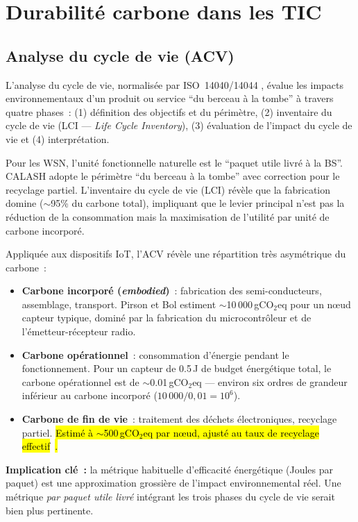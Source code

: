 \section{Durabilité carbone dans les TIC}\label{sec:revlit-carbon}

\subsection{Analyse du cycle de vie (ACV)}

L'analyse du cycle de vie, normalisée par ISO~14040/14044 \cite{iso14040}, évalue les impacts environnementaux d'un produit ou service ``du berceau à la tombe'' à travers quatre phases~: (1) définition des objectifs et du périmètre, (2) inventaire du cycle de vie (LCI --- \emph{Life Cycle Inventory}), (3) évaluation de l'impact du cycle de vie et (4) interprétation.

Pour les WSN, l'unité fonctionnelle naturelle est le ``paquet utile livré à la BS''. CALASH adopte le périmètre ``du berceau à la tombe'' avec correction pour le recyclage partiel. L'inventaire du cycle de vie (LCI) révèle que la fabrication domine ($\sim$95\% du carbone total), impliquant que le levier principal n'est pas la réduction de la consommation mais la maximisation de l'utilité par unité de carbone incorporé.

Appliquée aux dispositifs IoT, l'ACV révèle une répartition très asymétrique du carbone~:
\begin{itemize}
    \item \textbf{Carbone incorporé (\emph{embodied})}~: fabrication des semi-conducteurs, assemblage, transport. Pirson et Bol \cite{pirson2021embodied} estiment $\sim$10\,000\,gCO$_2$eq pour un n\oe{}ud capteur typique, dominé par la fabrication du microcontrôleur et de l'émetteur-récepteur radio.
    \item \textbf{Carbone opérationnel}~: consommation d'énergie pendant le fonctionnement. Pour un capteur de 0.5\,J de budget énergétique total, le carbone opérationnel est de $\sim$0.01\,gCO$_2$eq --- environ six ordres de grandeur inférieur au carbone incorporé ($10\,000/0{,}01 = 10^6$).
    \item \textbf{Carbone de fin de vie}~: traitement des déchets électroniques, recyclage partiel. \hl{Estimé à $\sim$500\,gCO$_2$eq par n\oe{}ud, ajusté au taux de recyclage effectif}~\cite{pirson2021embodied}\hl{.}
\end{itemize}

\textbf{Implication clé~:} la métrique habituelle d'efficacité énergétique (Joules par paquet) est une approximation grossière de l'impact environnemental réel. Une métrique \emph{par paquet utile livré} intégrant les trois phases du cycle de vie serait bien plus pertinente.

